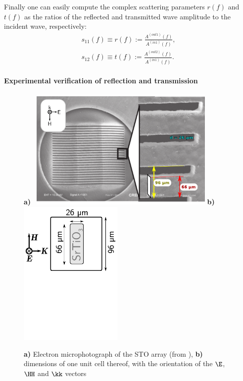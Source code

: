 Finally one can easily compute the complex scattering parameters $r(f)$ and $t(f)$ as the ratios of the reflected and transmitted wave amplitude to the incident wave, respectively:
\begin{equation} 
	\begin{split}
		s_{11}(f) \equiv r(f) := \frac{A^{(out 1)}(f)}{A^{(in 1)}(f)},\\
		s_{12}(f) \equiv t(f) := \frac{A^{(out 2)}(f)}{A^{(in 1)}(f)}.
	\end{split}
\label{eq_sparam}\end{equation}
\paragraph{Experimental verification of reflection and transmission} %
\begin{figure} 
\caption{\textbf{a)} Electron microphotograph of the STO array (from \cite{nemec2009tunable}), %
\textbf{b)} dimensions of one unit cell thereof, with the orientation of the $\E$, $\HH$ and $\kk$ vectors}  \centering 
\textbf{a)} \mbox{\vspace{3cm} \includegraphics[width=9cm]{img/STOBar_photo.pdf}}  %
\mbox{\textbf{b)} \mbox{\vspace{3cm}\includegraphics[width=5cm]{img/EBars_STO_sketch.pdf}} }
\label{fg_STO_bar_geom} \end{figure} 
